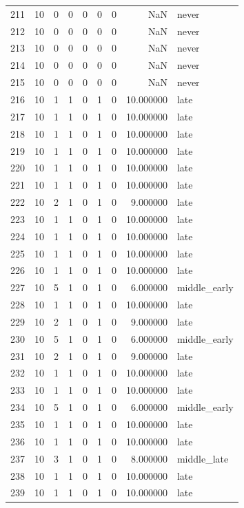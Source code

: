 \begin{longtable}{rrrrrrrrl}
211 & 10 & 0 & 0 & 0 & 0 & 0 & NaN & never \\
212 & 10 & 0 & 0 & 0 & 0 & 0 & NaN & never \\
213 & 10 & 0 & 0 & 0 & 0 & 0 & NaN & never \\
214 & 10 & 0 & 0 & 0 & 0 & 0 & NaN & never \\
215 & 10 & 0 & 0 & 0 & 0 & 0 & NaN & never \\
216 & 10 & 1 & 1 & 0 & 1 & 0 & 10.000000 & late \\
217 & 10 & 1 & 1 & 0 & 1 & 0 & 10.000000 & late \\
218 & 10 & 1 & 1 & 0 & 1 & 0 & 10.000000 & late \\
219 & 10 & 1 & 1 & 0 & 1 & 0 & 10.000000 & late \\
220 & 10 & 1 & 1 & 0 & 1 & 0 & 10.000000 & late \\
221 & 10 & 1 & 1 & 0 & 1 & 0 & 10.000000 & late \\
222 & 10 & 2 & 1 & 0 & 1 & 0 & 9.000000 & late \\
223 & 10 & 1 & 1 & 0 & 1 & 0 & 10.000000 & late \\
224 & 10 & 1 & 1 & 0 & 1 & 0 & 10.000000 & late \\
225 & 10 & 1 & 1 & 0 & 1 & 0 & 10.000000 & late \\
226 & 10 & 1 & 1 & 0 & 1 & 0 & 10.000000 & late \\
227 & 10 & 5 & 1 & 0 & 1 & 0 & 6.000000 & middle\_early \\
228 & 10 & 1 & 1 & 0 & 1 & 0 & 10.000000 & late \\
229 & 10 & 2 & 1 & 0 & 1 & 0 & 9.000000 & late \\
230 & 10 & 5 & 1 & 0 & 1 & 0 & 6.000000 & middle\_early \\
231 & 10 & 2 & 1 & 0 & 1 & 0 & 9.000000 & late \\
232 & 10 & 1 & 1 & 0 & 1 & 0 & 10.000000 & late \\
233 & 10 & 1 & 1 & 0 & 1 & 0 & 10.000000 & late \\
234 & 10 & 5 & 1 & 0 & 1 & 0 & 6.000000 & middle\_early \\
235 & 10 & 1 & 1 & 0 & 1 & 0 & 10.000000 & late \\
236 & 10 & 1 & 1 & 0 & 1 & 0 & 10.000000 & late \\
237 & 10 & 3 & 1 & 0 & 1 & 0 & 8.000000 & middle\_late \\
238 & 10 & 1 & 1 & 0 & 1 & 0 & 10.000000 & late \\
239 & 10 & 1 & 1 & 0 & 1 & 0 & 10.000000 & late \\

\end{longtable}
